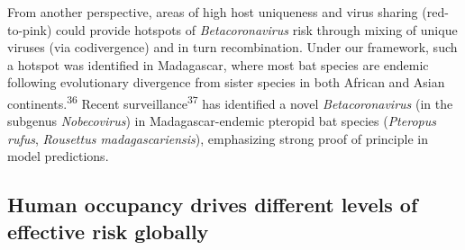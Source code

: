 \documentclass[10pt,oneside]{article}
\begin{document}
From another perspective, areas of high host uniqueness and virus
sharing (red-to-pink) could provide hotspots of \emph{Betacoronavirus}
risk through mixing of unique viruses (via codivergence) and in turn
recombination. Under our framework, such a hotspot was identified in
Madagascar, where most bat species are endemic following evolutionary
divergence from sister species in both African and Asian
continents.\textsuperscript{36} Recent surveillance\textsuperscript{37}
has identified a novel \emph{Betacoronavirus} (in the subgenus
\emph{Nobecovirus}) in Madagascar-endemic pteropid bat species
(\emph{Pteropus rufus}, \emph{Rousettus madagascariensis}), emphasizing
strong proof of principle in model predictions.

\hypertarget{human-occupancy-drives-different-levels-of-effective-risk-globally}{%
\subsection{Human occupancy drives different levels of effective risk
globally}\label{human-occupancy-drives-different-levels-of-effective-risk-globally}}
\end{document}
